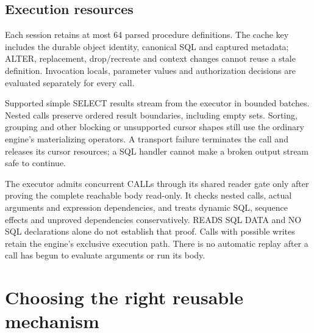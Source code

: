 \subsection{Execution resources}

Each session retains at most 64 parsed procedure definitions. The cache key
includes the durable object identity, canonical SQL and captured metadata;
ALTER, replacement, drop/recreate and context changes cannot reuse a stale
definition. Invocation locals, parameter values and authorization decisions
are evaluated separately for every call.

Supported simple SELECT results stream from the executor in bounded batches.
Nested calls preserve ordered result boundaries, including empty sets.
Sorting, grouping and other blocking or unsupported cursor shapes still use
the ordinary engine's materializing operators. A transport failure terminates
the call and releases its cursor resources; a SQL handler cannot make a broken
output stream safe to continue.

The executor admits concurrent CALLs through its shared reader gate only after
proving the complete reachable body read-only. It checks nested calls, actual
arguments and expression dependencies, and treats dynamic SQL, sequence
effects and unproved dependencies conservatively. READS SQL DATA and NO SQL
declarations alone do not establish that proof. Calls with possible writes
retain the engine's exclusive execution path. There is no automatic replay
after a call has begun to evaluate arguments or run its body.


\section{Choosing the right reusable mechanism}

